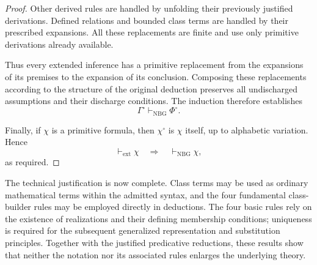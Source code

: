 \begin{proof}
Other derived rules are handled by unfolding
their previously justified derivations.
Defined relations and bounded class terms
are handled by their prescribed expansions.
All these replacements are finite and use
only primitive derivations already available.

Thus every extended inference has a primitive
replacement from the expansions of its premises
to the expansion of its conclusion. Composing
these replacements according to the structure
of the original deduction preserves all
undischarged assumptions and their discharge
conditions. The induction therefore establishes
\[
\Gamma^\circ\vdash_{\mathrm{NBG}}\Phi^\circ.
\]

Finally, if \(\chi\) is a primitive formula,
then \(\chi^\circ\) is \(\chi\) itself, up to
alphabetic variation. Hence
\[
\vdash_{\mathrm{ext}}\chi
\quad\Longrightarrow\quad
\vdash_{\mathrm{NBG}}\chi,
\]
as required.
\end{proof}

The technical justification is now complete. Class terms
may be used as ordinary mathematical terms within the
admitted syntax, and the four fundamental class-builder
rules may be employed directly in deductions. The four
basic rules rely on the existence of realizations and
their defining membership conditions;
uniqueness is required for the subsequent generalized
representation and substitution principles. Together
with the justified predicative reductions, these results
show that neither the notation nor its associated rules
enlarges the underlying theory.


\setcounter{FileDepth}{2}
\setcounter{SideTOCDepth}{2}